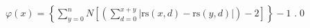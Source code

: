 \begin{pf} \rm
 $\displaystyle \varphi(x) = 
\left\{ \sum_{y=0}^{n} N\left[
\left( \sum_{d=0}^{x+y} \Big| \mathrm{rs}(x, d) - \mathrm{rs}(y, d)\Big| \right) - 2  \right]
\right\}
- 1$ .\qed
\end{pf}

